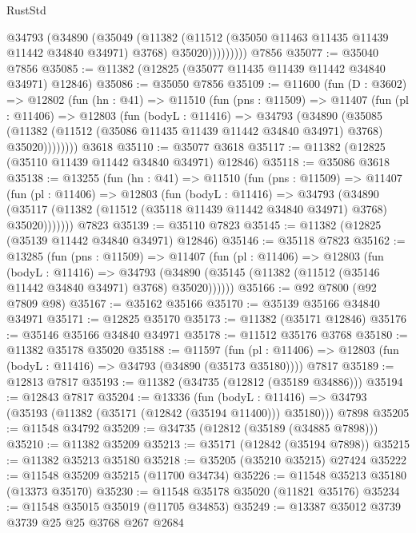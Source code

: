\begin{lexlean}{RustStd}
\begin{coremodule}
              @34793
                (@34890
                  (@35049
                    (@11382
                      (@11512 (@35050 @11463 @11435 @11439 @11442 @34840 @34971) @3768)
                      @35020)))))))))
    @7856
@35077 := @35040 @7856
@35085 := @11382 (@12825 (@35077 @11435 @11439 @11442 @34840 @34971) @12846)
@35086 := @35050 @7856
@35109 := @11600
    (fun (D : @3602) =>
    @12802
      (fun (hn : @41) =>
      @11510
        (fun (pns : @11509) =>
        @11407
          (fun (pl : @11406) =>
          @12803
            (fun (bodyL : @11416) =>
            @34793
              (@34890
                (@35085
                  (@11382 (@11512 (@35086 @11435 @11439 @11442 @34840 @34971) @3768) @35020))))))))
    @3618
@35110 := @35077 @3618
@35117 := @11382 (@12825 (@35110 @11439 @11442 @34840 @34971) @12846)
@35118 := @35086 @3618
@35138 := @13255
    (fun (hn : @41) =>
    @11510
      (fun (pns : @11509) =>
      @11407
        (fun (pl : @11406) =>
        @12803
          (fun (bodyL : @11416) =>
          @34793
            (@34890
              (@35117 (@11382 (@11512 (@35118 @11439 @11442 @34840 @34971) @3768) @35020)))))))
    @7823
@35139 := @35110 @7823
@35145 := @11382 (@12825 (@35139 @11442 @34840 @34971) @12846)
@35146 := @35118 @7823
@35162 := @13285
    (fun (pns : @11509) =>
    @11407
      (fun (pl : @11406) =>
      @12803
        (fun (bodyL : @11416) =>
        @34793 (@34890 (@35145 (@11382 (@11512 (@35146 @11442 @34840 @34971) @3768) @35020))))))
@35166 := @92 @7800 (@92 @7809 @98)
@35167 := @35162 @35166
@35170 := @35139 @35166 @34840 @34971
@35171 := @12825 @35170
@35173 := @11382 (@35171 @12846)
@35176 := @35146 @35166 @34840 @34971
@35178 := @11512 @35176 @3768
@35180 := @11382 @35178 @35020
@35188 := @11597
    (fun (pl : @11406) => @12803 (fun (bodyL : @11416) => @34793 (@34890 (@35173 @35180))))
    @7817
@35189 := @12813 @7817
@35193 := @11382 (@34735 (@12812 (@35189 @34886)))
@35194 := @12843 @7817
@35204 := @13336
    (fun (bodyL : @11416) => @34793 (@35193 (@11382 (@35171 (@12842 (@35194 @11400))) @35180)))
    @7898
@35205 := @11548 @34792
@35209 := @34735 (@12812 (@35189 (@34885 @7898)))
@35210 := @11382 @35209
@35213 := @35171 (@12842 (@35194 @7898))
@35215 := @11382 @35213 @35180
@35218 := @35205 (@35210 @35215) @27424
@35222 := @11548 @35209 @35215 (@11700 @34734)
@35226 := @11548 @35213 @35180 (@13373 @35170)
@35230 := @11548 @35178 @35020 (@11821 @35176)
@35234 := @11548 @35015 @35019 (@11705 @34853)
@35249 := @13387
    @35012
    @3739
    @3739
    @25
    @25
    @3768
    @267
    @2684

\end{coremodule}
\end{lexlean}
